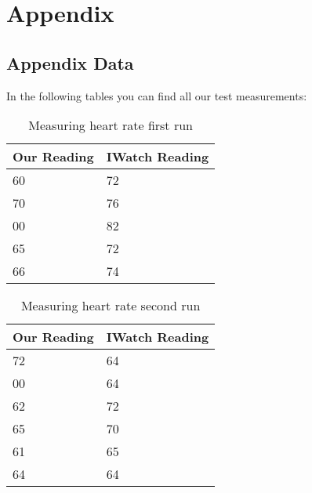 \chapter{Appendix}


\section{Appendix Data}
In the following tables you can find all our test measurements:

\begin{table}[h!]
	\centering
	\begin{tabular}{@{}ll@{}}
		\toprule
		\textbf{Our Reading} & \textbf{IWatch Reading }\\ \midrule
		60          & 72             \\
		70          & 76             \\
		00          & 82             \\
		65          & 72             \\
		66          & 74             \\ \bottomrule
	\end{tabular}
	\caption[Measuring heart rate first run]{Measuring heart rate first run}
	\label{tab:HeartRateFirst}
\end{table}

\begin{table}[h!]
	\centering
	\begin{tabular}{@{}ll@{}}
		\toprule
		\textbf{Our Reading} & \textbf{IWatch Reading} \\ \midrule
		72          & 64             \\
		00          & 64             \\
		62          & 72             \\
		65          & 70             \\
		61          & 65      		 \\      
		64          & 64			 \\ \bottomrule
	\end{tabular}
	\caption[Measuring heart rate second run]{Measuring heart rate second run}
	\label{tab:HeartRateSecond}
\end{table}

